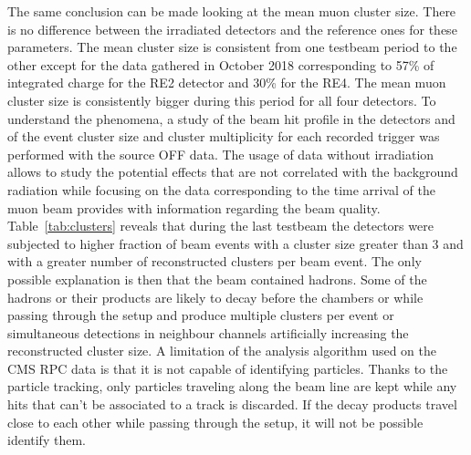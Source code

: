 	The same conclusion can be made looking at the mean muon cluster size. There is no difference between the irradiated detectors and the reference ones for these parameters. The mean cluster size is consistent from one testbeam period to the other except for the data gathered in October 2018 corresponding to 57\% of integrated charge for the RE2 detector and 30\% for the RE4. The mean muon cluster size is consistently bigger during this period for all four detectors. To understand the phenomena, a study of the beam hit profile in the detectors and of the event cluster size and cluster multiplicity for each recorded trigger was performed with the source OFF data. The usage of data without irradiation allows to study the potential effects that are not correlated with the background radiation while focusing on the data corresponding to the time arrival of the muon beam provides with information regarding the beam quality. Table~\ref{tab:clusters} reveals that during the last testbeam the detectors were subjected to higher fraction of beam events with a cluster size greater than 3 and with a greater number of reconstructed clusters per beam event. The only possible explanation is then that the beam contained hadrons. Some of the hadrons or their products are likely to decay before the chambers or while passing through the setup and produce multiple clusters per event or simultaneous detections in neighbour channels artificially increasing the reconstructed cluster size. A limitation of the analysis algorithm used on the CMS RPC data is that it is not capable of identifying particles. Thanks to the particle tracking, only particles traveling along the beam line are kept while any hits that can't be associated to a track is discarded. If the decay products travel close to each other while passing through the setup, it will not be possible identify them.
	
